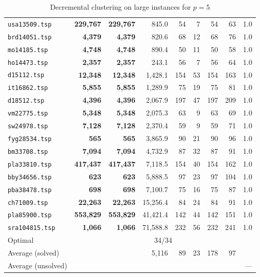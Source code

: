 \documentclass[ijoo,nonblindrev]{informs-ijoo}
\begin{document}
\begin{table}[!hbtp]
{\begin{tabular}{|l|rrrrrrrr|}
			\texttt{usa13509.tsp} & \textbf{229,767} & \textbf{229,767} & 845.0 & 54 & 7 & 54 & 63 & 1.0\\
			\texttt{brd14051.tsp} & \textbf{4,379} & \textbf{4,379} & 820.6 & 68 & 12 & 68 & 76 & 1.0\\
			\texttt{mo14185.tsp} & \textbf{4,748} & \textbf{4,748} & 890.4 & 50 & 11 & 50 & 58 & 1.0\\
			\texttt{ho14473.tsp} & \textbf{2,357} & \textbf{2,357} & 243.1 & 56 & 7 & 56 & 64 & 1.0\\
			\texttt{d15112.tsp} & \textbf{12,348} & \textbf{12,348} & 1,428.1 & 154 & 53 & 154 & 163 & 1.0\\
			\texttt{it16862.tsp} & \textbf{5,855} & \textbf{5,855} & 1,289.9 & 75 & 19 & 75 & 81 & 1.0\\
			\texttt{d18512.tsp} & \textbf{4,396} & \textbf{4,396} & 2,067.9 & 197 & 47 & 197 & 209 & 1.0\\
			\texttt{vm22775.tsp} & \textbf{5,348} & \textbf{5,348} & 2,075.3 & 63 & 9 & 63 & 69 & 1.0\\
			\texttt{sw24978.tsp} & \textbf{7,128} & \textbf{7,128} & 2,370.4 & 59 & 9 & 59 & 71 & 1.0\\
			\texttt{fyg28534.tsp} & \textbf{565} & \textbf{565} & 3,865.9 & 90 & 21 & 90 & 96 & 1.0\\
			\texttt{bm33708.tsp} & \textbf{7,094} & \textbf{7,094} & 4,732.9 & 87 & 32 & 87 & 91 & 1.0\\
			\texttt{pla33810.tsp} & \textbf{417,437} & \textbf{417,437} & 7,118.5 & 154 & 40 & 154 & 162 & 1.0\\
			\texttt{bby34656.tsp} & \textbf{623} & \textbf{623} & 5,888.5 & 97 & 23 & 97 & 104 & 1.0\\
			\texttt{pba38478.tsp} & \textbf{698} & \textbf{698} & 7,100.7 & 75 & 16 & 75 & 87 & 1.0\\
			\texttt{ch71009.tsp} & \textbf{22,263} & \textbf{22,263} & 15,256.4 & 84 & 24 & 84 & 91 & 1.0\\
			\texttt{pla85900.tsp} & \textbf{553,829} & \textbf{553,829} & 41,421.4 & 142 & 44 & 142 & 151 & 1.0\\
			\texttt{sra104815.tsp} & \textbf{1,066} & \textbf{1,066} & 71,588.8 & 232 & 56 & 232 & 241 & 1.0\\
			\hline
			Optimal &  \multicolumn{8}{|c|}{34/34}\\
			Average (solved) & & & 5,116 & 89 & 23 & 178 & 97 & \\
			Average (unsolved) & & & & & & & & ---\\
			\hline
	\end{tabular}}
	\caption{Decremental clustering on large instances for $p = 5$\label{table:large:p5}}
\end{table}
\end{document}
